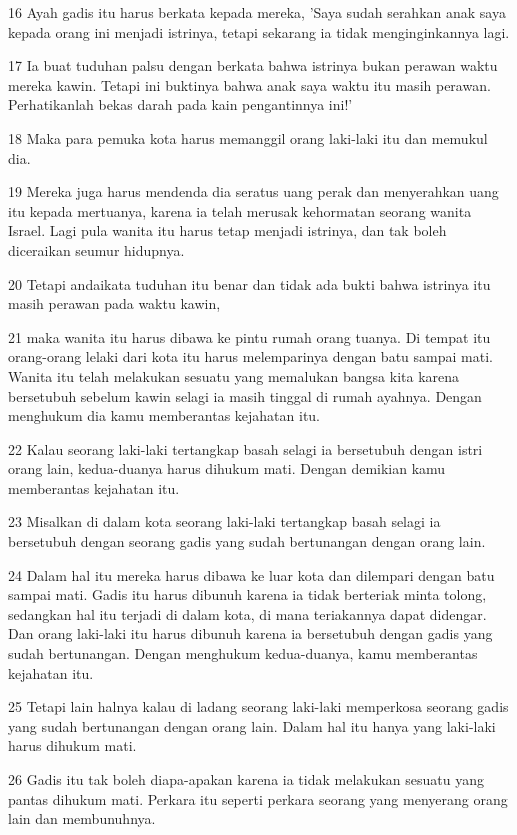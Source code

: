 \par 16 Ayah gadis itu harus berkata kepada mereka, 'Saya sudah serahkan anak saya kepada orang ini menjadi istrinya, tetapi sekarang ia tidak menginginkannya lagi.
\par 17 Ia buat tuduhan palsu dengan berkata bahwa istrinya bukan perawan waktu mereka kawin. Tetapi ini buktinya bahwa anak saya waktu itu masih perawan. Perhatikanlah bekas darah pada kain pengantinnya ini!'
\par 18 Maka para pemuka kota harus memanggil orang laki-laki itu dan memukul dia.
\par 19 Mereka juga harus mendenda dia seratus uang perak dan menyerahkan uang itu kepada mertuanya, karena ia telah merusak kehormatan seorang wanita Israel. Lagi pula wanita itu harus tetap menjadi istrinya, dan tak boleh diceraikan seumur hidupnya.
\par 20 Tetapi andaikata tuduhan itu benar dan tidak ada bukti bahwa istrinya itu masih perawan pada waktu kawin,
\par 21 maka wanita itu harus dibawa ke pintu rumah orang tuanya. Di tempat itu orang-orang lelaki dari kota itu harus melemparinya dengan batu sampai mati. Wanita itu telah melakukan sesuatu yang memalukan bangsa kita karena bersetubuh sebelum kawin selagi ia masih tinggal di rumah ayahnya. Dengan menghukum dia kamu memberantas kejahatan itu.
\par 22 Kalau seorang laki-laki tertangkap basah selagi ia bersetubuh dengan istri orang lain, kedua-duanya harus dihukum mati. Dengan demikian kamu memberantas kejahatan itu.
\par 23 Misalkan di dalam kota seorang laki-laki tertangkap basah selagi ia bersetubuh dengan seorang gadis yang sudah bertunangan dengan orang lain.
\par 24 Dalam hal itu mereka harus dibawa ke luar kota dan dilempari dengan batu sampai mati. Gadis itu harus dibunuh karena ia tidak berteriak minta tolong, sedangkan hal itu terjadi di dalam kota, di mana teriakannya dapat didengar. Dan orang laki-laki itu harus dibunuh karena ia bersetubuh dengan gadis yang sudah bertunangan. Dengan menghukum kedua-duanya, kamu memberantas kejahatan itu.
\par 25 Tetapi lain halnya kalau di ladang seorang laki-laki memperkosa seorang gadis yang sudah bertunangan dengan orang lain. Dalam hal itu hanya yang laki-laki harus dihukum mati.
\par 26 Gadis itu tak boleh diapa-apakan karena ia tidak melakukan sesuatu yang pantas dihukum mati. Perkara itu seperti perkara seorang yang menyerang orang lain dan membunuhnya.
